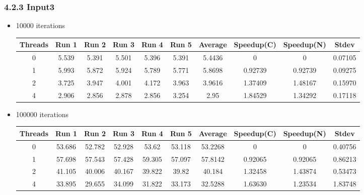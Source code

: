 \documentclass{article}
\begin{document}
\subsubsection*{4.2.3 Input3} 
 \begin{itemize}
\item 10000 iterations
\begin{center}
 \begin{adjustbox}{width=\columnwidth, center} 
 \begin{tabular}{ | |c | c c c c c | c | c c | c | |} \hline 
 Threads & Run 1 & Run 2 & Run 3 & Run 4 & Run 5 & Average & Speedup(C) & Speedup(N) & Stdev \\ [0.5ex] 
 \hline 
 \hline 
0& 5.539 & 5.391 & 5.501 & 5.396 & 5.391 & 5.4436 & 0 & 0 & 0.07105\\ 
 \hline
1& 5.993 & 5.872 & 5.924 & 5.789 & 5.771 & 5.8698 & 0.92739 & 0.92739 & 0.09275\\ 
 \hline
2& 3.725 & 3.947 & 4.001 & 4.172 & 3.963 & 3.9616 & 1.37409 & 1.48167 & 0.15970\\ 
 \hline
4& 2.906 & 2.856 & 2.878 & 2.856 & 3.254 & 2.95 & 1.84529 & 1.34292 & 0.17118\\ 
 \hline
\end{tabular} 
 \end{adjustbox} 
 \end{center} 
\item 100000 iterations
\begin{center}
 \begin{adjustbox}{width=\columnwidth, center} 
 \begin{tabular}{ | |c | c c c c c | c | c c | c | |} \hline 
 Threads & Run 1 & Run 2 & Run 3 & Run 4 & Run 5 & Average & Speedup(C) & Speedup(N) & Stdev \\ [0.5ex] 
 \hline 
 \hline 
0& 53.686 & 52.782 & 52.928 & 53.62 & 53.118 & 53.2268 & 0 & 0 & 0.40756\\ 
 \hline
1& 57.698 & 57.543 & 57.428 & 59.305 & 57.097 & 57.8142 & 0.92065 & 0.92065 & 0.86213\\ 
 \hline
2& 41.105 & 40.006 & 40.167 & 39.822 & 39.82 & 40.184 & 1.32458 & 1.43874 & 0.53473\\ 
 \hline
4& 33.895 & 29.655 & 34.099 & 31.822 & 33.173 & 32.5288 & 1.63630 & 1.23534 & 1.83748\\ 
 \hline
\end{tabular} 
 \end{adjustbox} 
 \end{center} 
\end{itemize}
\end{document}
